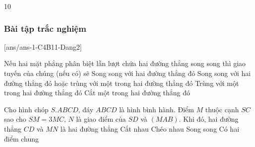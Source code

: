 \begin{indapan}{10}
\subsubsection{Bài tập trắc nghiệm}
[ans/ans-1-C4B11-Dang2]
\begin{ex}
	Nếu hai mặt phẳng phân biệt lần lượt chứa hai đường thẳng song song thì giao tuyến của chúng (nếu có) sẽ
	\choice
	{Song song với hai đường thẳng đó}
	{\True Song song với hai đường thẳng đó hoặc trùng với một trong hai đường thẳng đó}
	{Trùng với một trong hai đường thẳng đó}
	{Cắt một trong hai đường thẳng đó}
	\loigiai{
		
	}
\end{ex}

\begin{ex}%
	Cho hình chóp $S.ABCD$, đáy $ABCD$ là hình bình hành. Điểm $M$ thuộc cạnh $SC$ sao cho $SM=3MC$, $N$ là giao điểm của $SD$ và $(MAB)$. Khi đó, hai đường thẳng $CD$ và $MN$ là hai đường thẳng
	\choice
	{Cắt nhau}
	{Chéo nhau}
	{\True Song song}
	{Có hai điểm chung}
\end{ex}


\end{indapan}

